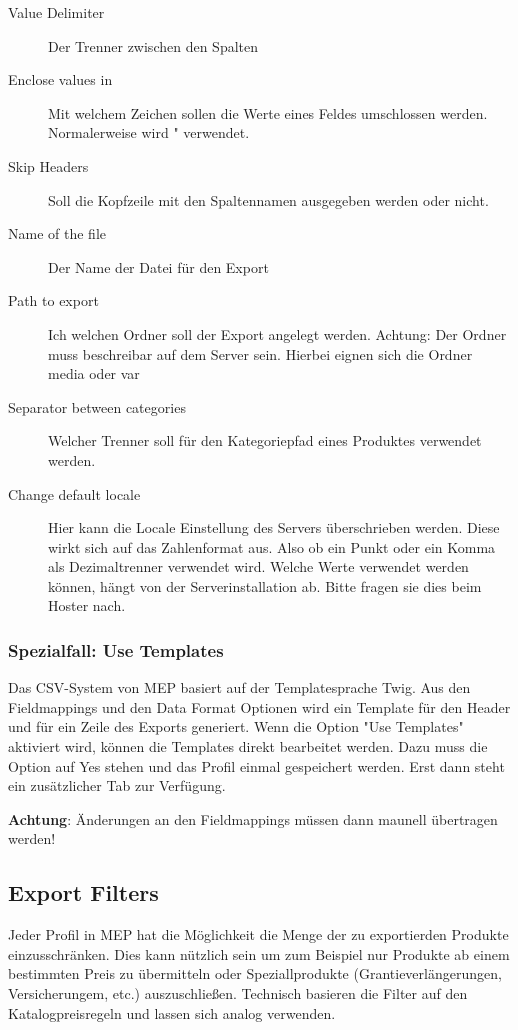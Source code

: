 \documentclass[a4paper,12pt]{book}
\begin{document}
\begin{description}
\item[Value Delimiter] Der Trenner zwischen den Spalten
\item[Enclose values in] Mit welchem Zeichen sollen die Werte eines
Feldes umschlossen werden. Normalerweise wird " verwendet.
\item[Skip Headers] Soll die Kopfzeile mit den Spaltennamen ausgegeben
werden oder nicht.
\item[Name of the file] Der Name der Datei für den Export
\item[Path to export] Ich welchen Ordner soll der Export angelegt
werden. Achtung: Der Ordner muss beschreibar auf dem Server sein.
Hierbei eignen sich die Ordner media oder var
\item[Separator between categories] Welcher Trenner soll für den
Kategoriepfad eines Produktes verwendet werden.
\item[Change default locale] Hier kann die Locale Einstellung des
Servers überschrieben werden. Diese wirkt sich auf das Zahlenformat
aus. Also ob ein Punkt oder ein Komma als Dezimaltrenner verwendet
wird. Welche Werte verwendet werden können, hängt von der
Serverinstallation ab. Bitte fragen sie dies beim Hoster nach.
\end{description}


\subsubsection{Spezialfall: Use Templates}
Das CSV-System von MEP basiert auf der Templatesprache Twig. Aus den
Fieldmappings und den Data Format Optionen wird ein Template für den
Header und für ein Zeile des Exports generiert. Wenn die Option "Use
Templates" aktiviert wird, können die Templates direkt bearbeitet
werden. Dazu muss die Option auf Yes stehen und das Profil einmal
gespeichert werden. Erst dann steht ein zusätzlicher Tab zur Verfügung.

\textbf{Achtung}: Änderungen an den Fieldmappings müssen dann maunell
übertragen werden!

\subsection{Export Filters}
Jeder Profil in MEP hat die Möglichkeit die Menge der zu exportierden
Produkte einzusschränken. Dies kann nützlich sein um zum Beispiel nur
Produkte ab einem bestimmten Preis zu übermitteln oder
Speziallprodukte (Grantieverlängerungen, Versicherungem, etc.)
auszuschließen. Technisch basieren die Filter auf den
Katalogpreisregeln und lassen sich analog verwenden.
\end{document}
